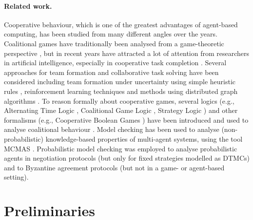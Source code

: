 \documentclass{llncs}
\begin{document}
\paragraph{Related work.} Cooperative behaviour, which is one of the greatest advantages of agent-based computing, has been studied from many different angles over the years.
Coalitional games have traditionally been analysed from a game-theoretic perspective \cite{osborne1994course}, but in recent years have attracted a lot of attention from researchers in artificial intelligence, especially in cooperative task completion \cite{shehory1998methods}.
Several approaches for team formation and collaborative task solving have been considered including team formation under uncertainty using simple heuristic rules \cite{kraus2003coalition}, reinforcement learning techniques \cite{abdallah2004organization} and methods using distributed graph algorithms \cite{manisterski2006forming}.
To reason formally about cooperative games, several logics (e.g., Alternating Time Logic \cite{AlurHK02}, Coalitional Game Logic \cite{agotnes2009reasoning}, Strategy Logic \cite{chatterjee2007strategy}) and other formalisms (e.g., Cooperative Boolean Games \cite{dunne2008cooperative}) have been introduced and used to analyse coalitional behaviour \cite{bonzon2007efficient}.
Model checking has been used to analyse (non-probabilistic) knowledge-based properties of multi-agent systems,
using the tool MCMAS \cite{lomuscio2006mcmas}.
Probabilistic model checking was employed to
analyse probabilistic agents in negotiation protocols \cite{BFW06b}
(but only for fixed strategies modelled as DTMCs)
and to Byzantine agreement protocols \cite{KN02}
(but not in a game- or agent-based setting).
\vspace{-10pt}
\section{Preliminaries}
\vspace{-5pt}
\end{document}
